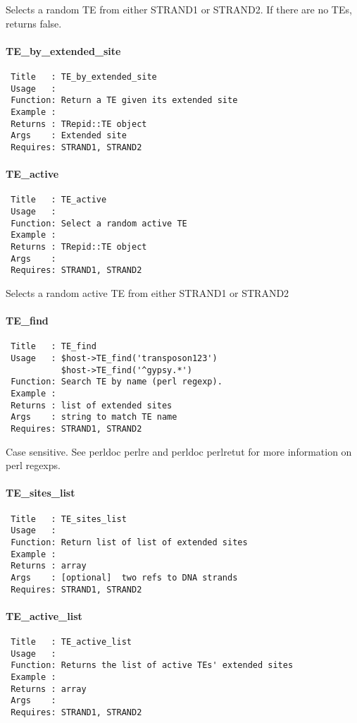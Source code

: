 Selects a random TE from either STRAND1 or STRAND2. If there are no
TEs, returns false.

\paragraph*{TE\_by\_extended\_site\label{TE_by_extended_site}}
\begin{verbatim}
 Title   : TE_by_extended_site
 Usage   : 
 Function: Return a TE given its extended site
 Example : 
 Returns : TRepid::TE object
 Args    : Extended site
 Requires: STRAND1, STRAND2
\end{verbatim}
\paragraph*{TE\_active\label{TE_active}}
\begin{verbatim}
 Title   : TE_active
 Usage   : 
 Function: Select a random active TE
 Example : 
 Returns : TRepid::TE object
 Args    : 
 Requires: STRAND1, STRAND2
\end{verbatim}


Selects a random active TE from either STRAND1 or STRAND2

\paragraph*{TE\_find\label{TE_find}}
\begin{verbatim}
 Title   : TE_find
 Usage   : $host->TE_find('transposon123')
           $host->TE_find('^gypsy.*')
 Function: Search TE by name (perl regexp).
 Example : 
 Returns : list of extended sites
 Args    : string to match TE name
 Requires: STRAND1, STRAND2
\end{verbatim}


Case sensitive. See perldoc perlre and perldoc perlretut for more
information on perl regexps.

\paragraph*{TE\_sites\_list\label{TE_sites_list}}
\begin{verbatim}
 Title   : TE_sites_list
 Usage   :
 Function: Return list of list of extended sites
 Example :
 Returns : array
 Args    : [optional]  two refs to DNA strands
 Requires: STRAND1, STRAND2
\end{verbatim}
\paragraph*{TE\_active\_list\label{TE_active_list}}
\begin{verbatim}
 Title   : TE_active_list
 Usage   : 
 Function: Returns the list of active TEs' extended sites 
 Example : 
 Returns : array
 Args    : 
 Requires: STRAND1, STRAND2
\end{verbatim}
